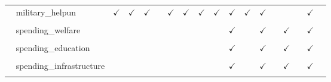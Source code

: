 \documentclass[
  12pt]{article}
\begin{document}
\begin{table}[H]
{\begin{tabular}{lcccccccccccccccc}
$\hspace{10pt}$military\_helpun & $\checkmark$ & $\checkmark$ & $\checkmark$ &  & $\checkmark$ & $\checkmark$ & $\checkmark$ & $\checkmark$ & $\checkmark$ & $\checkmark$ & $\checkmark$ &  &  &  & $\checkmark$ & \\
\cellcolor{gray!6}{$\textbf{Spending}$} & \cellcolor{gray!6}{} & \cellcolor{gray!6}{} & \cellcolor{gray!6}{} & \cellcolor{gray!6}{} & \cellcolor{gray!6}{} & \cellcolor{gray!6}{} & \cellcolor{gray!6}{} & \cellcolor{gray!6}{} & \cellcolor{gray!6}{} & \cellcolor{gray!6}{} & \cellcolor{gray!6}{} & \cellcolor{gray!6}{} & \cellcolor{gray!6}{} & \cellcolor{gray!6}{} & \cellcolor{gray!6}{} & \cellcolor{gray!6}{}\\
$\hspace{10pt}$spending\_welfare &  &  &  &  &  &  &  &  & $\checkmark$ &  & $\checkmark$ &  & $\checkmark$ &  & $\checkmark$ & \\
\cellcolor{gray!6}{$\hspace{10pt}$spending\_healthcare} & \cellcolor{gray!6}{} & \cellcolor{gray!6}{} & \cellcolor{gray!6}{} & \cellcolor{gray!6}{} & \cellcolor{gray!6}{} & \cellcolor{gray!6}{} & \cellcolor{gray!6}{} & \cellcolor{gray!6}{} & \cellcolor{gray!6}{$\checkmark$} & \cellcolor{gray!6}{} & \cellcolor{gray!6}{$\checkmark$} & \cellcolor{gray!6}{} & \cellcolor{gray!6}{$\checkmark$} & \cellcolor{gray!6}{} & \cellcolor{gray!6}{$\checkmark$} & \cellcolor{gray!6}{}\\
$\hspace{10pt}$spending\_education &  &  &  &  &  &  &  &  & $\checkmark$ &  & $\checkmark$ &  & $\checkmark$ &  & $\checkmark$ & \\
\cellcolor{gray!6}{$\hspace{10pt}$spending\_police} & \cellcolor{gray!6}{} & \cellcolor{gray!6}{} & \cellcolor{gray!6}{} & \cellcolor{gray!6}{} & \cellcolor{gray!6}{} & \cellcolor{gray!6}{} & \cellcolor{gray!6}{} & \cellcolor{gray!6}{} & \cellcolor{gray!6}{$\checkmark$} & \cellcolor{gray!6}{} & \cellcolor{gray!6}{$\checkmark$} & \cellcolor{gray!6}{} & \cellcolor{gray!6}{$\checkmark$} & \cellcolor{gray!6}{} & \cellcolor{gray!6}{$\checkmark$} & \cellcolor{gray!6}{}\\
$\hspace{10pt}$spending\_infrastructure &  &  &  &  &  &  &  &  & $\checkmark$ &  & $\checkmark$ &  & $\checkmark$ &  & $\checkmark$ & \\
\cellcolor{gray!6}{$\hspace{10pt}$spending\_vs\_tax} & \cellcolor{gray!6}{$\checkmark$} & \cellcolor{gray!6}{$\checkmark$} & \cellcolor{gray!6}{$\checkmark$} & \cellcolor{gray!6}{} & \cellcolor{gray!6}{$\checkmark$} & \cellcolor{gray!6}{$\checkmark$} & \cellcolor{gray!6}{$\checkmark$} & \cellcolor{gray!6}{$\checkmark$} & \cellcolor{gray!6}{$\checkmark$} & \cellcolor{gray!6}{$\checkmark$} & \cellcolor{gray!6}{$\checkmark$} & \cellcolor{gray!6}{$\checkmark$} & \cellcolor{gray!6}{} & \cellcolor{gray!6}{} & \cellcolor{gray!6}{$\checkmark$} & \cellcolor{gray!6}{}\\

\end{tabular}}
\end{table}
\end{document}
